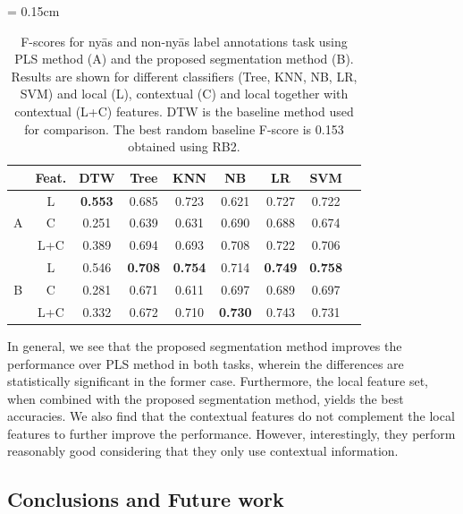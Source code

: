{{\begin{table} 
	\centering
	\tabcolsep = 0.15cm
	\renewcommand{\arraystretch}{1.15}
	\begin{tabular}{ c|c|c | c  c  c  c  c  c }
		\hline\hline
		& Feat.	&	DTW & Tree	 &	KNN 	&	NB		& LR 	&	SVM	\\
		\hline
		
		\multirow{3}{*}{A} &   L		& \textbf{0.553} & 0.685 & 0.723 & 0.621 & 0.727 & 0.722	\\
		&	C   		& 0.251 & 0.639 & 0.631  & 0.690 & 0.688 & 0.674	\\
		& 	L+C		& 0.389 & 0.694 & 0.693 & 0.708 & 0.722 & 0.706	\\	
		\hline
		\multirow{3}{*}{B} & 	L		& 0.546 & \textbf{0.708} & \textbf{0.754} & 0.714 & \textbf{0.749} & \textbf{0.758} \\
		& 	C		&0.281 & 0.671 & 0.611 & 0.697 & 0.689 & 0.697\\
		& 	L+C		& 0.332 & 0.672 & 0.710 & \textbf{0.730} & 0.743 & 0.731\\
		\hline\hline        
	\end{tabular}
	\caption{F-scores for ny\={a}s and non-ny\={a}s label annotations task using PLS method (A) and the proposed segmentation method (B). Results are shown for different classifiers (Tree, KNN, NB, LR, SVM) and local (L), contextual (C) and local together with contextual (L+C) features. DTW is the baseline method used for comparison. The best random baseline F-score is  0.153 obtained using RB2. } 
	\label{tab:accuraciesRegion}
\end{table}


In general, we see that the proposed segmentation method improves the performance over PLS method in both tasks, wherein the differences are statistically significant in the former case. Furthermore, the local feature set, when combined with the proposed segmentation method, yields the best accuracies. We also find that the contextual features do not complement the local features to further improve the performance. However, interestingly, they perform reasonably good considering that they only use contextual information.


\subsection{Conclusions and Future work}
\label{ConclusionAndFutureWork}

}}
